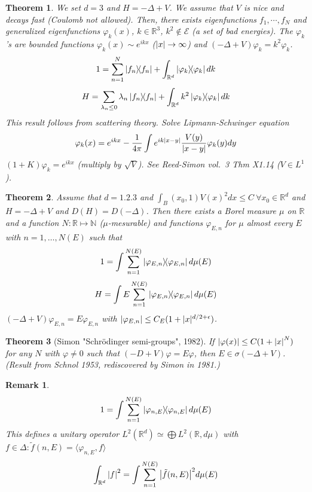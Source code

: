 \documentclass{article}
\newtheorem*{theorem}{Theorem}
\newtheorem*{remark}{Remark}
\newcommand{\RR}{\mathbb{R}}
\newcommand{\NN}{\mathbb{N}}
\newcommand{\cE}{\mathcal{E}}
\newcommand{\la}{\lambda}
\renewcommand{\sp}[2]{\langle #1,#2 \rangle}
\begin{document}
\begin{theorem}
  We set $d = 3$ and $H = - \Delta + V$.
  We assume that $V$ is nice and decays fast (Coulomb not allowed).
  Then, there exists eigenfunctions $f_1,\cdots,f_N$
  and generalized eigenfunctions $\varphi_k(x)$, $k \in \RR^3$, $k^2 \notin \cE$ (a set of bad energies).
  The $\varphi_k$'s are bounded functions $\varphi_k(x) \sim e^{ikx}$ ($\abs{x} \to \infty$)
  and $(-\Delta + V)\varphi_k = k^2 \varphi_k$.
  $$ 1 = \sum_{n=1}^N \dyad{f_n} + \int_{\RR^d} \dyad{\varphi_k} dk $$
  $$ H = \sum_{\la_n \le 0} \la_n \dyad{f_n} + \int_{\RR^d} k^2 \dyad{\varphi_k} dk $$                                                                                      
  This result follows from scattering theory.
  Solve Lipmann-Schwinger equation
  $$ \varphi_k(x) = e^{ikx} - \frac{1}{4\pi} \int e^{ik\abs{x-y}} \frac{V(y)}{\abs{x-y}} \varphi_k(y) dy $$
  $(1 + K) \varphi_k = e^{ikx}$ (multiply by $\sqrt{V}$).
  See Reed-Simon vol.~3 Thm X1.14 ($V \in L^1$).
\end{theorem}

\begin{theorem}
  Assume that $d = \qty{1,2,3}$ and $\int_B(x_0,1) V(x)^2 dx \le C \ \forall x_0 \in \RR^d$ and
  $H = -\Delta + V$ and $D(H) = D(-\Delta)$.
  Then there exists a Borel measure $\mu$ on $\RR$ and a function 
  $N \colon \RR \mapsto \NN$ ($\mu$-mesurable) and functions $\varphi_{E,n}$ for $\mu$ almost every $E$  with $n=1,\ldots,N(E)$ such that 
  $$ 1 = \int \sum_{n=1}^{N(E)} \dyad{\varphi_{E,n}} d\mu(E) $$
  $$ H = \int E \sum_{n=1}^{N(E)}  \dyad{\varphi_{E,n}} d\mu(E) $$
  $(-\Delta+V)\varphi_{E,n} = E \varphi_{E,n}$ with $\abs{\varphi_{E,n}} \le C_E (1 + |x|^{d/2+\epsilon})$.
\end{theorem}

\begin{theorem}[Simon "Schr\"odinger semi-groups", 1982]
  If $\abs{\varphi(x)} \le C(1+\abs{x}^N)$ for any $N$ with $\varphi \neq 0$ 
  such that $(-D + V) \varphi = E \varphi$, 
  then $E \in \sigma(-\Delta+V)$.
  (Result from Schnol 1953, rediscovered by Simon in 1981.)
\end{theorem}

\begin{remark}
  $$1 = \int \sum_{n=1}^{N(E)} \dyad{\varphi_{n,E}} d\mu(E)$$ 
  This defines a unitary operator $L^2(\RR^d) \simeq \bigoplus L^2(\RR,d\mu)$
  with $f \in \Delta \colon \tilde{f}(n,E) = \sp{\varphi_{n,E}}{f}$
  $$\int_{\RR^d} \abs{f}^2 = \int \sum_{n=1}^{N(E)} \abs{\tilde{f}(n,E)}^2 d\mu(E) $$
\end{remark}
\end{document}
